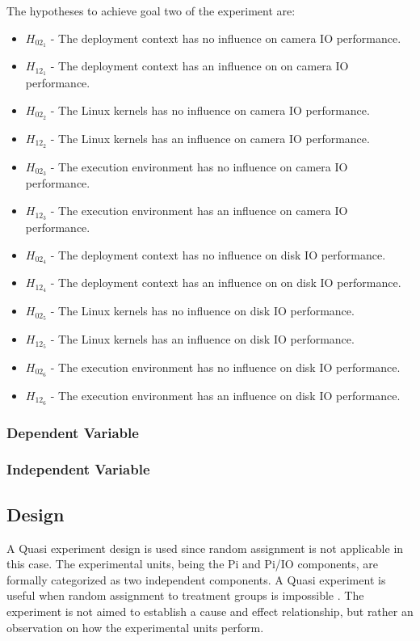 The hypotheses to achieve goal two of the experiment are:
\begin{itemize}
\item $H_{02_{1}}$ - The deployment context has no influence on camera IO performance.
\item $H_{12_{1}}$ - The deployment context has an influence on on camera IO performance.
\item $H_{02_{2}}$ - The Linux kernels has no influence on camera IO performance.
\item $H_{12_{2}}$ - The Linux kernels has an influence on camera IO performance.
\item $H_{02_{3}}$ - The execution environment has no influence on camera IO performance.
\item $H_{12_{3}}$ - The execution environment has an influence on camera IO performance.
\item $H_{02_{4}}$ - The deployment context has no influence on disk IO performance.
\item $H_{12_{4}}$ - The deployment context has an influence on on disk IO performance.
\item $H_{02_{5}}$ - The Linux kernels has no influence on disk IO performance.
\item $H_{12_{5}}$ - The Linux kernels has an influence on disk IO performance.
\item $H_{02_{6}}$ - The execution environment has no influence on disk IO performance.
\item $H_{12_{6}}$ - The execution environment has an influence on disk IO performance.
\end{itemize}


\subsubsection{Dependent Variable}
\subsubsection{Independent Variable}

\subsection{Design}
A Quasi experiment design is used since random assignment is not applicable in this case. The experimental units, being the Pi and Pi/IO components, are
formally categorized as two independent components. A Quasi experiment is useful when random assignment to treatment groups is impossible \cite{juristo2003lecture}. The experiment is not aimed to establish a cause and effect relationship, but rather an observation on how the experimental units perform.
